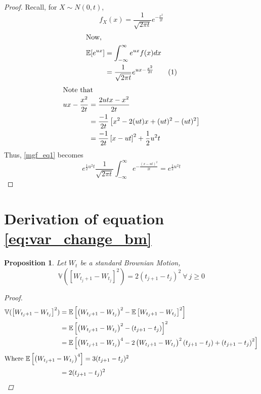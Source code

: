 \documentclass[11pt]{report}
\newtheorem{proposition}{Proposition}[chapter]
\newcommand\numberthis{\addtocounter{equation}{1}\tag{\theequation}}
\begin{document}
\begin{appendices}
  \begin{proof}
  	Recall, for $X \sim N(0, t)$,
  	\[f_X(x) = \frac{1}{\sqrt{2\pi t}}e^{-\frac{x^2}{2t}} \]  	
  	\begin{align*}
  	\shortintertext{Now,}
  		\mathbb{E}[e^{ux}] &= \int_{-\infty}^{\infty} e^{ux} f(x) dx \\
  		&= \frac{1}{\sqrt{2\pi t}}e^{ux - \frac{x^2}{2t}} \numberthis \label{mgf_eq1} \\
  	\end{align*}
  	\begin{align*}
	  	\shortintertext{Note that}
  		ux - \frac{x^2}{2t} &= \frac{2utx 	- x^2}{2t}\\
  		&= \frac{-1}{2t}\left[x^2 -2(ut)x + (ut)^2 - (ut)^2\right]\\
  		&= \frac{-1}{2t}\left[x - ut\right]^2 + \frac{1}{2}u^2t
  	\end{align*}
  	Thus, \ref{mgf_eq1} becomes
  	\begin{equation}
  		e^{\frac{1}{2}u^2t} \frac{1}{\sqrt{2\pi t}}\int_{-\infty}^{\infty}e^{-\frac{\left(x - ut\right)^2}{2t}} = e^{\frac{1}{2}u^2t}
  	\end{equation}
  \end{proof}
  
  \section{Derivation of equation \ref{eq:var_change_bm}} \label{proof:var_change_bm}
  \begin{proposition}
  Let $W_t$ be a standard Brownian Motion, 
  \begin{equation*}
  	\mathbb{V}(\left[W_{t_j+1} - W_{t_j}\right]^2) = 2\left(t_{j+1} - t_j\right)^2 \ \forall \ j \geq 0 
  \end{equation*}
  
  \begin{proof}
  \begin{align*}
  	\mathbb{V}(\left[W_{t_j+1} - W_{t_j}\right]^2) &= \mathbb{E}\left[\left(W_{t_j+1} - W_{t_j}\right)^2 - \mathbb{E}\left[W_{t_j+1} - W_{t_j}\right]^2\right] \\
  	&= \mathbb{E}\left[\left(W_{t_j+1} - W_{t_j}\right)^2 -\left(t_{j+1} - t_j\right)\right]^2 \\
  	&= \mathbb{E}\left[\left(W_{t_j+1} - W_{t_j}\right)^4  - 2\left(W_{t_j+1} - W_{t_j}\right)^2 \left(t_{j+1} - t_j\right) + \left(t_{j+1} - t_j\right)^2\right] \\
  	\intertext{Where $\mathbb{E}\left[\left(W_{t_j+1} - W_{t_j}\right)^4\right] = 3(t_{j+1} - t_j)^2$}
   	&= 2(t_{j+1} - t_j)^2
  \end{align*}
  \end{proof}
  \end{proposition}
  

\end{appendices}


\newpage
\nocite{*}

\end{document}
